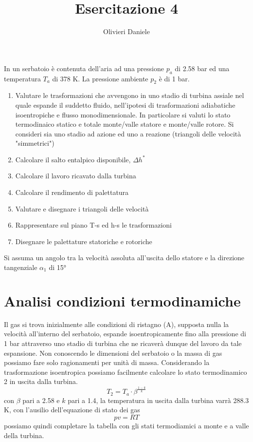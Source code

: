 \documentclass[a4paper,12pt]{article}
\title{Esercitazione 4}
\author{Olivieri Daniele}
\date{}
\begin{document}
\maketitle
In un serbatoio è contenuta dell'aria ad una pressione $p_a$ di 2.58 bar ed una temperatura $T_a$ di 378 K. La pressione ambiente $p_2$ è di 1 bar.
\begin{enumerate}
    \item Valutare le trasformazioni che avvengono in uno stadio di turbina assiale nel quale espande il suddetto fluido, nell'ipotesi
    di trasformazioni adiabatiche isoentropiche e flusso monodimensionale.
    In particolare si valuti lo stato termodinaico statico e totale monte/valle statore e monte/valle rotore. Si consideri sia uno stadio ad azione
    ed uno a reazione (triangoli delle velocità "simmetrici")    
    \item Calcolare il salto entalpico disponibile, $\Delta h^*$   
    \item Calcolare il lavoro ricavato dalla turbina
    \item Calcolare il rendimento di palettatura
    \item Valutare e disegnare i triangoli delle velocità
    \item Rappresentare sul piano T-s ed h-s le trasformazioni
    \item Disegnare le palettature statoriche e rotoriche
\end{enumerate}
Si assuma un angolo tra la velocità assoluta all'uscita dello statore e la direzione tangenziale $\alpha_1$ di 15°
\section{Analisi condizioni termodinamiche}
\label{sec:analisi_termodinamiche}
Il gas si trova inizialmente alle condizioni di ristagno (A), supposta nulla la velocità all'interno del serbatoio, espande isoentropicamente fino alla pressione di 1 bar
attraverso uno stadio di turbina che ne ricaverà dunque del lavoro da tale espansione. Non conoscendo le dimensioni del serbatoio o la massa di gas possiamo fare
solo ragionamenti per unità di massa.
Considerando la trasformazione isoentropica possiamo facilmente calcolare lo stato termodinamico 2 in uscita dalla turbina.
\begin{equation}
    \label{eq:isoentropica}
    T_2 = T_a\cdot\beta^{\frac{1-k}{k}}
\end{equation}
con $\beta$ pari a 2.58 e $k$ pari a 1.4, la temperatura in uscita dalla turbina varrà 288.3 K, con l'ausilio dell'equazione di stato dei gas
\begin{equation}
    \label{eq:stato_gas}
    pv = RT
\end{equation}
possiamo quindi completare la tabella con gli stati termodiamici a monte e a valle della turbina.
\end{document}
